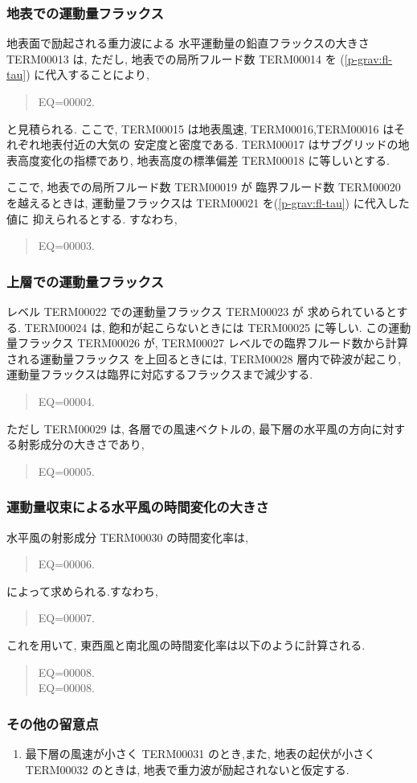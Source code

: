 \subsubsection{地表での運動量フラックス}

地表面で励起される重力波による
水平運動量の鉛直フラックスの大きさ TERM00013 は,
ただし, 地表での局所フルード数 
TERM00014 を
(\ref{p-grav:fl-tau}) に代入することにより,
%
\begin{quote}
EQ=00002.
\end{quote}
%
と見積られる.
ここで, 
TERM00015 は地表風速,
TERM00016,TERM00016 はそれぞれ地表付近の大気の
安定度と密度である.
TERM00017 はサブグリッドの地表高度変化の指標であり,
地表高度の標準偏差 TERM00018 に等しいとする.

ここで, 地表での局所フルード数 
TERM00019 が 臨界フルード数
TERM00020 を越えるときは, 
運動量フラックスは TERM00021 を(\ref{p-grav:fl-tau}) に代入した値に
抑えられるとする.
すなわち,
\begin{quote}
EQ=00003.
\end{quote}

\subsubsection{上層での運動量フラックス}

レベル TERM00022 での運動量フラックス TERM00023 が
求められているとする.
TERM00024 は, 飽和が起こらないときには
TERM00025 に等しい.
この運動量フラックス TERM00026 が,
TERM00027 レベルでの臨界フルード数から計算される運動量フラックス
を上回るときには, TERM00028 層内で砕波が起こり,
運動量フラックスは臨界に対応するフラックスまで減少する.

\begin{quote}
EQ=00004.
\end{quote}

ただし TERM00029 は,
各層での風速ベクトルの,
最下層の水平風の方向に対する射影成分の大きさであり,
\begin{quote}
EQ=00005.
\end{quote}

\subsubsection{運動量収束による水平風の時間変化の大きさ}

水平風の射影成分 TERM00030 の時間変化率は,
\begin{quote}
EQ=00006.
\end{quote}
%
によって求められる.すなわち,
%
\begin{quote}
EQ=00007.
\end{quote}
%
これを用いて,
東西風と南北風の時間変化率は以下のように計算される.
\begin{quote}
EQ=00008.\\
EQ=00008.
\end{quote}

\subsubsection{その他の留意点}

\begin{enumerate}
\item 最下層の風速が小さく TERM00031 のとき,また,
      地表の起伏が小さく TERM00032 のときは, 
      地表で重力波が励起されないと仮定する.
\end{enumerate}

